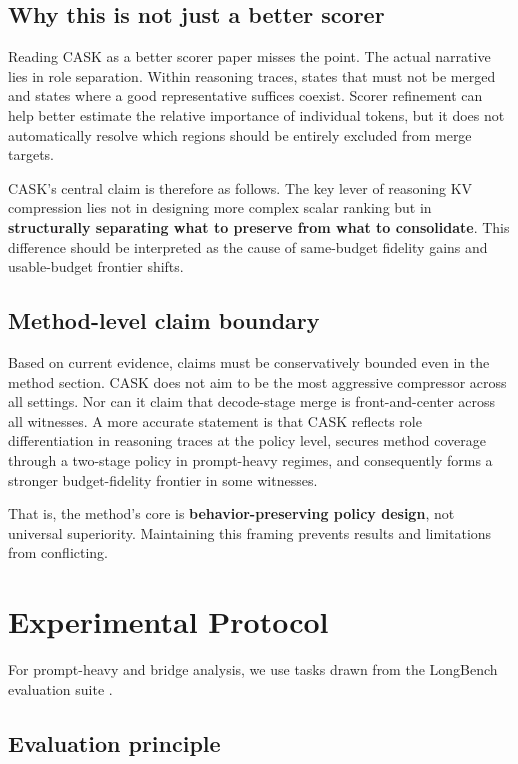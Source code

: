 \subsection{Why this is not just a better scorer}


Reading CASK as a better scorer paper misses the point. The actual narrative lies in role separation. Within reasoning traces, states that must not be merged and states where a good representative suffices coexist. Scorer refinement can help better estimate the relative importance of individual tokens, but it does not automatically resolve which regions should be entirely excluded from merge targets.


CASK's central claim is therefore as follows. The key lever of reasoning KV compression lies not in designing more complex scalar ranking but in \textbf{structurally separating what to preserve from what to consolidate}. This difference should be interpreted as the cause of same-budget fidelity gains and usable-budget frontier shifts.


\subsection{Method-level claim boundary}


Based on current evidence, claims must be conservatively bounded even in the method section. CASK does not aim to be the most aggressive compressor across all settings. Nor can it claim that decode-stage merge is front-and-center across all witnesses. A more accurate statement is that CASK reflects role differentiation in reasoning traces at the policy level, secures method coverage through a two-stage policy in prompt-heavy regimes, and consequently forms a stronger budget-fidelity frontier in some witnesses.


That is, the method's core is \textbf{behavior-preserving policy design}, not universal superiority. Maintaining this framing prevents results and limitations from conflicting.


\section{Experimental Protocol}

For prompt-heavy and bridge analysis, we use tasks drawn from the LongBench evaluation suite \citep{bai2024longbench}.


\subsection{Evaluation principle}


